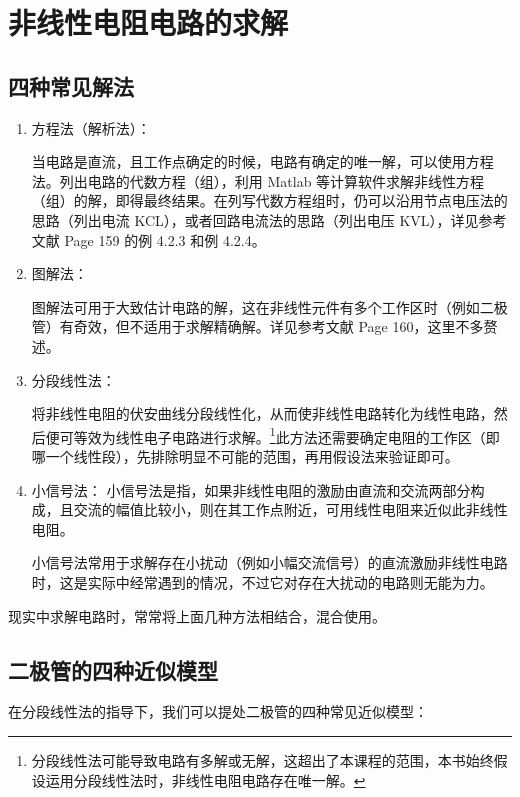 \documentclass[UTF8]{report}
\theoremstyle{MyLineTheoremStyle} %
\theoremstyle{MyBlockTheoremStyle} %
\theoremstyle{MySubsubsectionStyle} %
\begin{document}
\section{非线性电阻电路的求解}

\subsection{四种常见解法}
\begin{enumerate}
\item 方程法（解析法）：

当电路是直流，且工作点确定的时候，电路有确定的唯一解，可以使用方程法。列出电路的代数方程（组），利用 Matlab 等计算软件求解非线性方程（组）的解，即得最终结果。在列写代数方程组时，仍可以沿用节点电压法的思路（列出电流 KCL），或者回路电流法的思路（列出电压 KVL），详见参考文献 \cite{电路原理} Page 159 的例 4.2.3 和例 4.2.4。

\item 图解法：

图解法可用于大致估计电路的解，这在非线性元件有多个工作区时（例如二极管）有奇效，但不适用于求解精确解。详见参考文献 \cite{电路原理} Page 160，这里不多赘述。

\item 分段线性法：

将非线性电阻的伏安曲线分段线性化，从而使非线性电路转化为线性电路，然后便可等效为线性电子电路进行求解。\footnote{分段线性法可能导致电路有多解或无解，这超出了本课程的范围，本书始终假设运用分段线性法时，非线性电阻电路存在唯一解。}此方法还需要确定电阻的工作区（即哪一个线性段），先排除明显不可能的范围，再用假设法来验证即可。

\item 小信号法：
小信号法是指，如果非线性电阻的激励由直流和交流两部分构成，且交流的幅值比较小，则在其工作点附近，可用线性电阻来近似此非线性电阻。

小信号法常用于求解存在小扰动（例如小幅交流信号）的直流激励非线性电路时，这是实际中经常遇到的情况，不过它对存在大扰动的电路则无能为力。
\end{enumerate}

现实中求解电路时，常常将上面几种方法相结合，混合使用。

\subsection{二极管的四种近似模型}
在分段线性法的指导下，我们可以提处二极管的四种常见近似模型：
\end{document}
